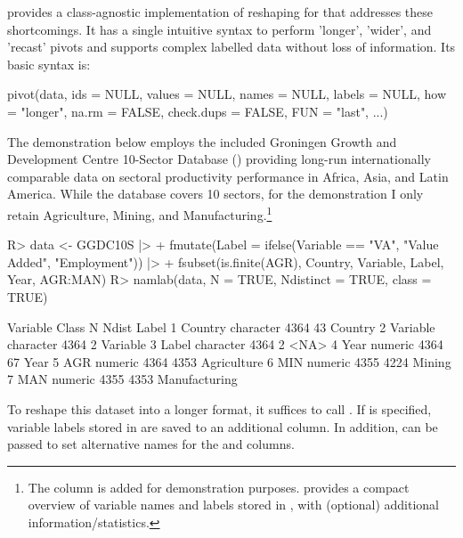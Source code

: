 \documentclass[nojss]{jss} %
\newcommand{\fct}[1]{\code{#1()}}
\begin{document}
 provides a class-agnostic implementation of reshaping for  that addresses these shortcomings. It has a single intuitive syntax to perform 'longer', 'wider', and 'recast' pivots and supports complex labelled data without loss of information. Its basic syntax is:
%
\begin{Code}
pivot(data, ids = NULL, values = NULL, names = NULL, labels = NULL,
  how = "longer", na.rm = FALSE, check.dups = FALSE, FUN = "last", ...)
\end{Code}
%
The demonstration below employs the included Groningen Growth and Development Centre 10-Sector Database (\href{https://sebkrantz.github.io/collapse/reference/GGDC10S.html}{}) providing long-run internationally comparable data on sectoral productivity performance in Africa, Asia, and Latin America. While the database covers 10 sectors, for the demonstration I only retain Agriculture, Mining, and Manufacturing.\footnote{The  column is added for demonstration purposes. \fct{namlab} provides a compact overview of variable names and labels stored in , with (optional) additional information/statistics.}
%
\begin{Schunk}
\begin{Sinput}
R> data <- GGDC10S |>
+    fmutate(Label = ifelse(Variable == "VA", "Value Added", "Employment")) |>
+    fsubset(is.finite(AGR), Country, Variable, Label, Year, AGR:MAN)
R> namlab(data, N = TRUE, Ndistinct = TRUE, class = TRUE)
\end{Sinput}
\begin{Soutput}
  Variable     Class    N Ndist         Label
1  Country character 4364    43       Country
2 Variable character 4364     2      Variable
3    Label character 4364     2          <NA>
4     Year   numeric 4364    67          Year
5      AGR   numeric 4364  4353   Agriculture
6      MIN   numeric 4355  4224        Mining
7      MAN   numeric 4355  4353 Manufacturing
\end{Soutput}
\end{Schunk}
%
To reshape this dataset into a longer format, it suffices to call . If  is specified, variable labels stored in  are saved to an additional column. In addition,  can be passed to set alternative names for the  and  columns.
%
\end{document}
